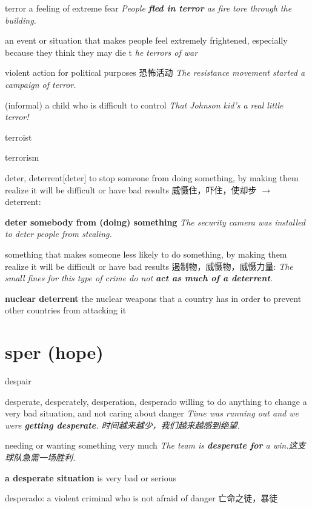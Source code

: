 \begin{DefWord}{terror}
    a feeling of extreme fear
    \textit{People \textbf{fled in terror} as fire tore through the building.}

    an event or situation that makes people feel extremely frightened, especially because they think they may die
    t 
    \textit{he terrors of war}

    violent action for political purposes 恐怖活动
    \textit{The resistance movement started a campaign of terror.}

    (informal) a child who is difficult to control
    \textit{That Johnson kid’s a real little terror!}

\end{DefWord}

\begin{DefWord}{terroist}
\end{DefWord}

\begin{DefWord}{terrorism}
\end{DefWord}

\begin{DefWord}{deter, deterrent}[deter]
    to stop someone from doing something, by making them realize it will be difficult or have bad results 威慑住，吓住，使却步 $\rightarrow$  deterrent:

    \textbf{deter somebody from (doing) something}
    \textit{The security camera was installed to deter people from stealing.}

    something that makes someone less likely to do something, by making them realize it will be difficult or have bad results 遏制物，威慑物，威慑力量:
    \textit{The small fines for this type of crime do not \textbf{act as much of a deterrent}.}

    \textbf{nuclear deterrent} the nuclear weapons that a country has in order to prevent other countries from attacking it
\end{DefWord}








\section{sper (hope)}

\begin{DefWord}{despair}
\end{DefWord}

\begin{DefWord}{desperate, desperately, desperation, desperado}
    willing to do anything to change a very bad situation, and not caring about danger
    \textit{Time was running out and we were \textbf{getting desperate}. 时间越来越少，我们越来越感到绝望. }

    needing or wanting something very much
    \textit{The team is \textbf{desperate for} a win.这支球队急需一场胜利. }

    \textbf{a desperate situation} is very bad or serious

    desperado:  a violent criminal who is not afraid of danger 亡命之徒，暴徒
\end{DefWord}


